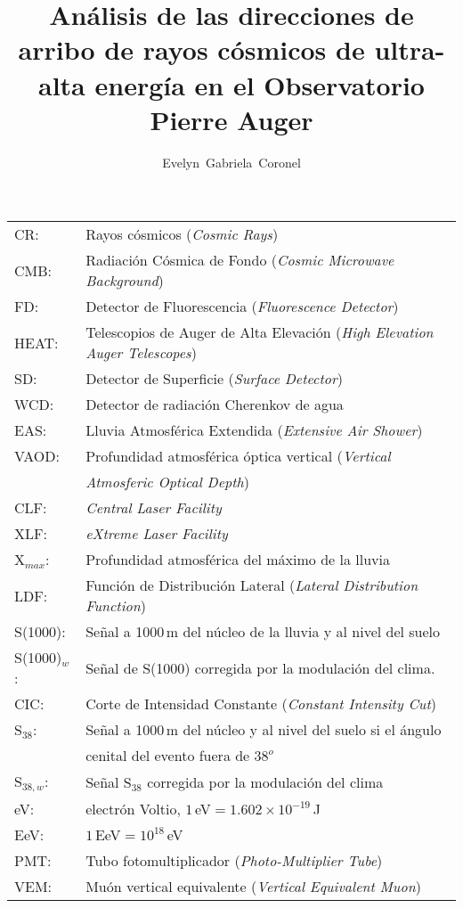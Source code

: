 \documentclass[12pt,papel,twoside,pagebackref]{ibtesis}
\title{Análisis de las direcciones de arribo de rayos cósmicos de ultra-alta energía en el Observatorio Pierre Auger}
\author{Evelyn~Gabriela~Coronel}
\begin{document}
\begin{preliminary}


\begin{abreviaturas}

\begin{tabular}{l l}
CR: 		& Rayos cósmicos  (\emph{Cosmic Rays}) \\
CMB: 		& Radiación Cósmica de Fondo (\emph{Cosmic Microwave Background})\\
FD: 		& Detector de Fluorescencia (\emph{Fluorescence Detector}) \\
HEAT:		& Telescopios de Auger de Alta Elevación (\emph{High Elevation Auger Telescopes})\\
SD: 		& Detector de Superficie (\emph{Surface Detector})  \\
WCD: 		& Detector de radiación Cherenkov de agua\\
EAS: 		& Lluvia Atmosférica Extendida  (\emph{Extensive Air Shower})    \\
VAOD: 		& Profundidad atmosférica óptica vertical (\emph{Vertical} \\
			& \emph{Atmosferic Optical Depth})\\
CLF:		& \emph{Central Laser Facility}\\
XLF:		& \emph{eXtreme Laser Facility}\\
X$_{max}$: 	& Profundidad atmosférica del máximo de la lluvia \\
LDF: 		& Función de Distribución Lateral (\emph{Lateral Distribution Function}) \\
S(1000): 	& Señal a 1000\,m del núcleo de la lluvia y al nivel del suelo \\
S(1000)$_w$:& Señal de S(1000) corregida por la modulación del clima. \\
CIC: 		& Corte de Intensidad Constante (\emph{Constant Intensity Cut}) \\
S$_{38}$: 	& Señal a 1000\,m del núcleo y al nivel del suelo si el ángulo\\
			& cenital del evento fuera de $38^o$\\
S$_{38,w}$: & Señal S$_{38}$ corregida por la modulación del clima \\
eV: 		& electrón Voltio, $1\,$eV$= 1.602\times 10^{-19}\,$J \\
EeV: 		& $1\,$EeV$=10^{18}\,$eV\\
PMT: 		& Tubo fotomultiplicador (\emph{Photo-Multiplier Tube})\\
VEM: 		& Muón vertical equivalente (\emph{Vertical Equivalent Muon})\\

\end{tabular}
\end{abreviaturas}
\end{preliminary}
\end{document}
